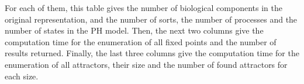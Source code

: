 \begin{changemargin}{-3cm}{-3cm}
\begin{center}
\begin{table}[ht]
\begin{center}
{For each of them, this table gives the number of biological components
in the original representation,
and the number of sorts, the number of processes
and the number of states in the PH model.
Then, the next two columns give the computation time for the enumeration of all fixed points and the number of results returned. Finally, the last three columns give the computation time for the enumeration of all attractors, their size and the number of found attractors for each size.
}
\end{center}
\end{table}
\end{center}
\end{changemargin}

